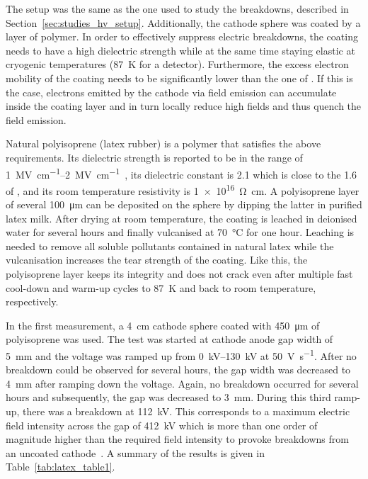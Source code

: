 The setup was the same as the one used to study the breakdowns, described in Section~\ref{sec:studies_hv_setup}.
Additionally, the cathode sphere was coated by a layer of polymer.
In order to effectively suppress electric breakdowns, the coating needs to have a high dielectric strength while at the same time staying elastic at cryogenic temperatures (\SI{87}{\kelvin} for a \lar{} detector).
Furthermore, the excess electron mobility of the coating needs to be significantly lower than the one of \lar{}.
If this is the case, electrons emitted by the cathode via field emission can accumulate inside the coating layer and in turn locally reduce high fields and thus quench the field emission.

Natural polyisoprene (latex rubber) is a polymer that satisfies the above requirements.
Its dielectric strength is reported to be in the range of \SIrange{1}{2}{\mega\volt\per\centi\metre}~\cite{fizikaDielektrikov}, its dielectric constant is \num{2.1} which is close to the \num{1.6} of \lar{}, and its room temperature resistivity is \SI{1e16}{\ohm\centi\metre}.
A polyisoprene layer of several \SI{100}{\micro\metre} can be deposited on the sphere by dipping the latter in purified latex milk.
After drying at room temperature, the coating is leached in deionised water for several hours and finally vulcanised at \SI{70}{\celsius} for one hour.
Leaching is needed to remove all soluble pollutants contained in natural latex while the vulcanisation increases the tear strength of the coating.
Like this, the polyisoprene layer keeps its integrity and does not crack even after multiple fast cool-down and warm-up cycles to \SI{87}{\kelvin} and back to room temperature, respectively.

In the first measurement, a \SI{4}{\centi\metre} cathode sphere coated with \SI{450}{\micro\metre} of polyisoprene was used.
The test was started at cathode anode gap width of \SI{5}{\milli\metre} and the voltage was ramped up from \SIrange{0}{130}{\kilo\volt} at \SI{50}{\volt\per\second}.
After no breakdown could be observed for several hours, the gap width was decreased to \SI{4}{\milli\metre} after ramping down the voltage.
Again, no breakdown occurred for several hours and subsequently, the gap was decreased to \SI{3}{\milli\metre}.
During this third ramp-up, there was a breakdown at \SI{112}{\kilo\volt}.
This corresponds to a maximum electric field intensity across the gap of \SI{412}{\kilo\volt} which is more than one order of magnitude higher than the required field intensity to provoke breakdowns from an uncoated cathode~\cite{breakdown_14, breakdown_16}.
A summary of the results is given in Table~\ref{tab:latex_table1}.

